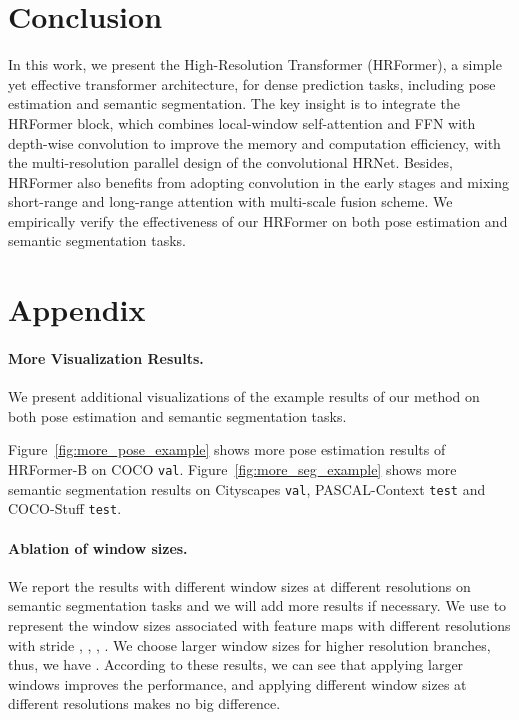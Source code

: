 \documentclass{article}
\begin{document}
\section{Conclusion}
In this work, we present the High-Resolution Transformer (HRFormer),
a simple yet effective transformer architecture,
for dense prediction tasks, including pose estimation and semantic segmentation.
The key insight is to integrate the HRFormer block,
which combines local-window self-attention
and FFN with depth-wise convolution to improve the memory and computation efficiency,
with the multi-resolution parallel design of the convolutional HRNet.
Besides, HRFormer also benefits from adopting convolution in the
early stages and mixing short-range and long-range attention
with multi-scale fusion scheme.
We empirically verify the effectiveness of our HRFormer
on both pose estimation and semantic segmentation tasks.


\section{Appendix}

\paragraph{More Visualization Results.}
We present additional visualizations of the example results of our method
on both pose estimation and semantic segmentation tasks.

Figure~\ref{fig:more_pose_example} shows
more pose estimation results of HRFormer-B on COCO \texttt{val}.
Figure~\ref{fig:more_seg_example}
shows more semantic segmentation results on Cityscapes \texttt{val}, PASCAL-Context \texttt{test} and COCO-Stuff \texttt{test}.

\paragraph{Ablation of window sizes.}
We report the results with different window sizes at different resolutions on semantic segmentation tasks and we will add more results if necessary. We use  to represent the window sizes associated with feature maps with different resolutions with stride , , , . We choose larger window sizes for higher resolution branches, thus, we have . According to these results, we can see that applying larger windows improves the performance, and applying different window sizes at different resolutions makes no big difference.
\end{document}
